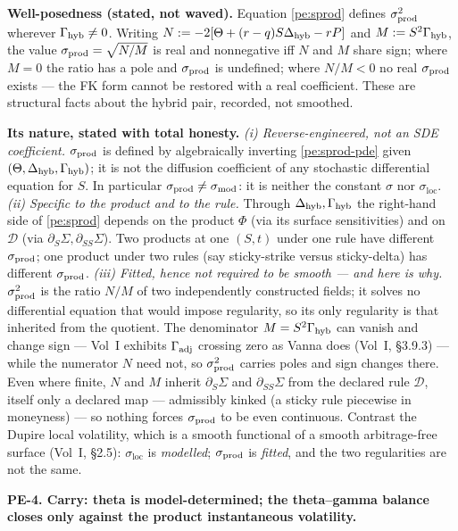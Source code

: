 \textbf{Well-posedness (stated, not waved).} Equation \eqref{pe:sprod} defines
$\sigma_{\mathrm{prod}}^2$ wherever $\Gamma_{\mathrm{hyb}}\neq0$. Writing $N := -2[\Theta+(r-q)S\Delta_{\mathrm{hyb}}-rP]$ and
$M := S^2\Gamma_{\mathrm{hyb}}$, the value $\sigma_{\mathrm{prod}}=\sqrt{N/M}$ is real and nonnegative iff $N$
and $M$ share sign; where $M=0$ the ratio has a pole and $\sigma_{\mathrm{prod}}$ is undefined;
where $N/M<0$ no real $\sigma_{\mathrm{prod}}$ exists --- the FK form cannot be restored with a
real coefficient. These are structural facts about the hybrid pair, recorded,
not smoothed.

\textbf{Its nature, stated with total honesty.}
\emph{(i) Reverse-engineered, not an SDE coefficient.} $\sigma_{\mathrm{prod}}$ is defined by
algebraically inverting \eqref{pe:sprod-pde} given $(\Theta,\Delta_{\mathrm{hyb}},\Gamma_{\mathrm{hyb}})$; it is
not the diffusion coefficient of any stochastic differential equation for $S$.
In particular $\sigma_{\mathrm{prod}} \neq \sigma_{\mathrm{mod}}$: it is neither the constant $\sigma$ nor
$\sigma_{\mathrm{loc}}$.
\emph{(ii) Specific to the product and to the rule.} Through $\Delta_{\mathrm{hyb}},\Gamma_{\mathrm{hyb}}$ the
right-hand side of \eqref{pe:sprod} depends on the product $\Phi$ (via its
surface sensitivities) and on $\mathcal{D}$ (via $\partial_S\Sigma,
\partial_{SS}\Sigma$). Two products at one $(S,t)$ under one rule have different
$\sigma_{\mathrm{prod}}$; one product under two rules (say sticky-strike versus sticky-delta)
has different $\sigma_{\mathrm{prod}}$.
\emph{(iii) Fitted, hence not required to be smooth --- and here is why.}
$\sigma_{\mathrm{prod}}^2$ is the ratio $N/M$ of two independently constructed fields; it solves
no differential equation that would impose regularity, so its only regularity is
that inherited from the quotient. The denominator $M=S^2\Gamma_{\mathrm{hyb}}$ can vanish and
change sign --- Vol~I exhibits $\Gamma_{\mathrm{adj}}$ crossing zero as Vanna does
(Vol~I, \S3.9.3) --- while the numerator $N$ need not, so
$\sigma_{\mathrm{prod}}^2$ carries poles and sign changes there. Even where finite, $N$ and $M$
inherit $\partial_S\Sigma$ and $\partial_{SS}\Sigma$ from the declared rule
$\mathcal{D}$, itself only a declared map --- admissibly kinked (a
sticky rule piecewise in moneyness) --- so nothing forces $\sigma_{\mathrm{prod}}$ to be even
continuous. Contrast the Dupire local volatility, which is a smooth functional
of a smooth arbitrage-free surface (Vol~I, \S2.5): $\sigma_{\mathrm{loc}}$ is
\emph{modelled}; $\sigma_{\mathrm{prod}}$ is \emph{fitted}, and the two regularities are not the
same.

\textbf{PE-4. Carry: theta is model-determined; the theta--gamma
balance closes only against the product instantaneous volatility.}

